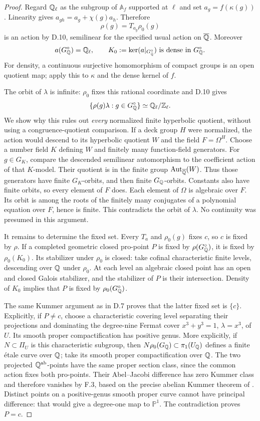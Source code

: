 \begin{proof}
Regard $\mathbb Q_\ell$ as the subgroup of $\mathbb A_f$ supported
at $\ell$ and set $a_g=f(\kappa(g))$. Linearity gives
$a_{gh}=a_g+\chi(g)a_h$. Therefore
\[
                   \rho(g)=T_{a_g}\rho_0(g)
\]
is an action by D.10, semilinear for the specified usual
action on $\overline{\mathbb Q}$. Moreover
\[
 a(G_\mathbb Q^\circ)=\mathbb Q_\ell,
 \qquad K_0:=\ker(a|_{G_\mathbb Q^\circ})
                     \text{ is dense in }G_\mathbb Q^\circ.
\]
For density, a continuous surjective homomorphism of compact
groups is an open quotient map; apply this to $\kappa$ and
the dense kernel of $f$.

The orbit of $\lambda$ is infinite: $\rho_0$ fixes this
rational coordinate and D.10 gives
\[
 \{\rho(g)\lambda:g\in G_\mathbb Q^\circ\}
       \simeq \mathbb Q_\ell/\mathbb Z_\ell.
\]
We show why this rules out \emph{every} normalized finite
hyperbolic quotient, without using a congruence-quotient
comparison. If a deck group $H$ were normalized, the action
would descend to its hyperbolic quotient $W$ and the field
$F=\Omega^H$. Choose a number field $K$ defining $W$ and
finitely many function-field generators. For $g\in G_K$,
compare the descended semilinear automorphism to the
coefficient action of that $K$-model. Their quotient is in
the finite group $\operatorname{Aut}_{\overline{\mathbb Q}}(W)$.
Thus those generators have finite $G_K$-orbits, and then
finite $G_\mathbb Q$-orbits. Constants also have finite orbits, so
every element of $F$ does. Each element of $\Omega$ is
algebraic over $F$. Its orbit is among the roots of the
finitely many conjugates of a polynomial equation over
$F$, hence is finite. This contradicts the orbit of
$\lambda$. No continuity was presumed in this argument.

It remains to determine the fixed set. Every $T_a$ and
$\rho_0(g)$ fixes $c$, so $c$ is fixed by $\rho$.
If a completed geometric closed pro-point $P$ is fixed by
$\rho(G_\mathbb Q^\circ)$, it is fixed by $\rho_0(K_0)$.
Its stabilizer under $\rho_0$ is closed: take cofinal
characteristic finite levels, descending over $\mathbb Q$ under
$\rho_0$. At each level an algebraic closed point has an
open and closed Galois stabilizer, and the stabilizer of
$P$ is their intersection. Density of $K_0$ implies that
$P$ is fixed by $\rho_0(G_\mathbb Q^\circ)$.

The same Kummer argument as in D.7 proves that the latter
fixed set is $\{c\}$. Explicitly, if $P\ne c$, choose a
characteristic covering level separating their projections
and dominating the degree-nine Fermat cover
$x^3+y^3=1$, $\lambda=x^3$, of $U$. Its smooth proper
compactification has positive genus. More explicitly, if
$N\subset\Pi_U$ is this characteristic subgroup, then
$N\rho_0(G_\mathbb Q)\subset\pi_1(U_\mathbb Q)$ defines a finite
\'etale curve over $\mathbb Q$; take its smooth proper
compactification over $\mathbb Q$. The two projected
$\mathbb Q^{\mathrm{ab}}$-points have the same proper section
class, since the common action fixes both pro-points.
Their Abel--Jacobi difference has zero Kummer class and
therefore vanishes by F.3, based on the precise abelian
Kummer theorem of \citet[Theorem~3.1]{F_Tsu2020}.
Distinct points on a positive-genus smooth proper curve
cannot have principal difference: that would give a
degree-one map to $\mathbb P^1$. The contradiction proves
$P=c$.
\end{proof}

